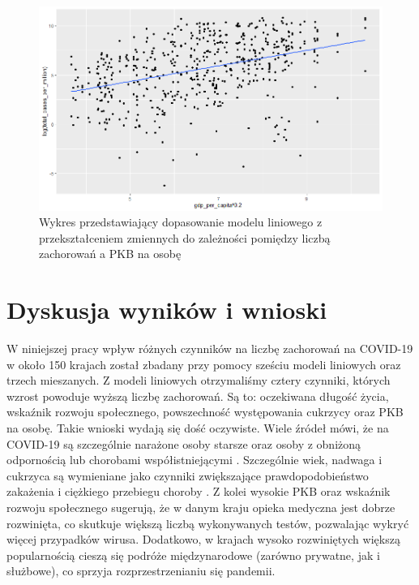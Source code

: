 \documentclass[12pt]{mwbk}
\theoremstyle{plain}
\theoremstyle{definition}
\theoremstyle{definition}
\newcommand\zrodlo[1]{\par\vspace{-3mm}{\small\textit{Źródło: }#1 }}
\begin{document}
\begin{figure}[!h]
	\centering
	\includegraphics[width=\linewidth]{rys/mod10-log.png}
	\caption{Wykres przedstawiający dopasowanie modelu liniowego z przekształceniem zmiennych do zależności pomiędzy liczbą zachorowań a PKB na osobę}
	\label{fig:mod10-log}
	\zrodlo{Opracowanie własne}
\end{figure}

\chapter*{Dyskusja wyników i wnioski}





W niniejszej pracy wpływ różnych czynników na liczbę zachorowań na COVID-19 w około 150 krajach został zbadany przy pomocy sześciu modeli liniowych oraz trzech mieszanych. Z modeli liniowych otrzymaliśmy cztery czynniki, których wzrost powoduje wyższą liczbę zachorowań. Są to: oczekiwana długość życia, wskaźnik rozwoju społecznego, powszechność występowania cukrzycy oraz PKB na osobę. Takie wnioski wydają się dość oczywiste. Wiele źródeł mówi, że na COVID-19 są szczególnie narażone osoby starsze oraz osoby z obniżoną odpornością lub chorobami współistniejącymi \cite{narazenie}. Szczególnie wiek, nadwaga i cukrzyca są wymieniane jako czynniki zwiększające prawdopodobieństwo zakażenia i ciężkiego przebiegu choroby \cite{covid-19}. Z kolei wysokie PKB oraz wskaźnik rozwoju społecznego sugerują, że w danym kraju opieka medyczna jest dobrze rozwinięta, co skutkuje większą liczbą wykonywanych testów, pozwalając wykryć więcej przypadków wirusa. Dodatkowo, w krajach wysoko rozwiniętych większą popularnością cieszą się podróże międzynarodowe (zarówno prywatne, jak i służbowe), co sprzyja rozprzestrzenianiu się pandemii.
\end{document}
